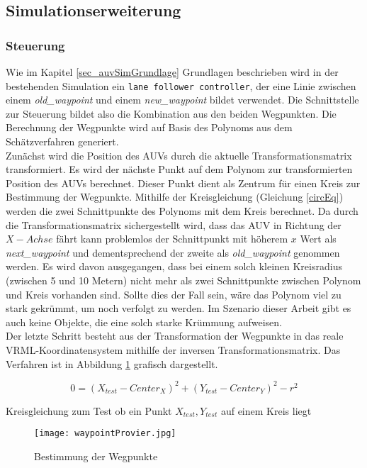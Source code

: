 \subsection{Simulationserweiterung}
\subsubsection{Steuerung}
\label{sec_waypoint}
Wie im Kapitel \ref{sec_auvSimGrundlage} Grundlagen beschrieben wird in der bestehenden Simulation ein \texttt{lane follower controller}, der eine Linie zwischen einem \textit{old\_waypoint} und einem \textit{new\_waypoint} bildet verwendet.
Die Schnittstelle zur Steuerung bildet also die Kombination aus den beiden Wegpunkten. Die Berechnung der Wegpunkte wird auf Basis des Polynoms aus dem Schätzverfahren generiert.\\
Zunächst wird die Position des AUVs durch die aktuelle Transformationsmatrix transformiert. Es wird der nächste Punkt auf dem Polynom zur transformierten Position des AUVs berechnet. Dieser Punkt dient als Zentrum für einen Kreis zur Bestimmung der Wegpunkte. Mithilfe der Kreisgleichung (Gleichung \ref{circEq}) werden die zwei Schnittpunkte des Polynoms mit dem Kreis berechnet. Da durch die Transformationsmatrix sichergestellt wird, dass das AUV in Richtung der $X-Achse$ fährt kann problemlos der Schnittpunkt mit höherem $x$ Wert als \textit{next\_waypoint} und dementsprechend der zweite als \textit{old\_waypoint} genommen werden. Es wird davon ausgegangen, dass bei einem solch kleinen Kreisradius (zwischen 5 und 10 Metern) nicht mehr als zwei Schnittpunkte zwischen Polynom und Kreis vorhanden sind. Sollte dies der Fall sein, wäre das Polynom viel zu stark gekrümmt, um noch verfolgt zu werden. Im Szenario dieser Arbeit gibt es auch keine Objekte, die eine solch starke Krümmung aufweisen.\\
Der letzte Schritt besteht aus der Transformation der Wegpunkte in das reale VRML-Koordinatensystem mithilfe der inversen Transformationsmatrix.
Das Verfahren ist in Abbildung \ref{wpCircle} grafisch dargestellt.

\begin{ownequation}[H]
\begin{equation}
0 = (X_{test}-Center_X)^2+(Y_{test}-Center_Y)^2 - r^2
\end{equation}
\caption{Kreisgleichung zum Test ob ein Punkt $X_{test},Y_{test}$ auf einem Kreis liegt}
\label{circEq}
\end{ownequation}

\begin{figure}[H]
\centering
\texttt{[image: waypointProvier.jpg]}
\caption{Bestimmung der Wegpunkte}
\label{wpCircle}
\end{figure}
